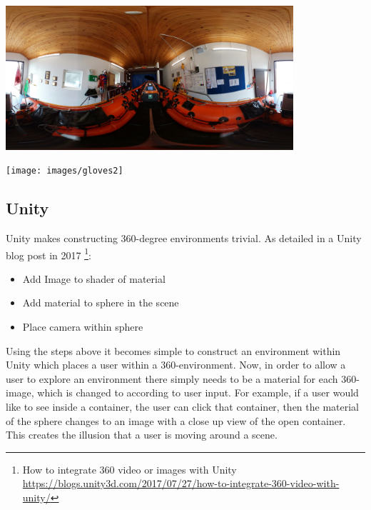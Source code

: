 \documentclass[a4paper, openright, twoside]{book}
\begin{document}
\begin{minipage}{\textwidth}
\hfill \break
\centering
\includegraphics[width=0.8\textwidth]{images/centre}
\label{model}
\hfill \break
\end{minipage}

\begin{minipage}{\textwidth}
\hfill \break
\centering
\texttt{[image: images/gloves2]}
\label{model}
\hfill \break
\end{minipage}


\subsection{Unity}
Unity makes constructing 360-degree environments trivial. As detailed in a Unity blog post in 2017 \footnote{How to integrate 360 video or images with Unity \url{https://blogs.unity3d.com/2017/07/27/how-to-integrate-360-video-with-unity/}}: 

\begin{itemize}
\item Add Image to shader of material
\item Add material to sphere in the scene
\item Place camera within sphere
\end{itemize}

Using the steps above it becomes simple to construct an environment within Unity which places a user within a 360-environment. Now, in order to allow a user to explore an environment there simply needs to be a material for each 360-image, which is changed to according to user input. For example, if a user would like to see inside a container, the user can click that container, then the material of the sphere changes to an image with a close up view of the open container. This creates the illusion that a user is moving around a scene. 
\end{document}

